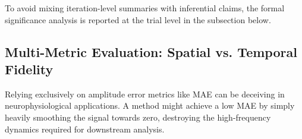 \begin{table}[ht]
\centering
\caption{Mean $\pm$ SD of MAE ($\times 10^{-6}$) and SNR (dB) stratified by degradation severity and spatial failure mode. Best values per stratum in \textbf{bold}.}
\label{tab:main_results}
\end{table}

To avoid mixing iteration-level summaries with inferential claims, the formal significance analysis is reported at the trial level in the subsection below.

\subsection{Multi-Metric Evaluation: Spatial vs. Temporal Fidelity}

Relying exclusively on amplitude error metrics like MAE can be deceiving in neurophysiological applications. A method might achieve a low MAE by simply heavily smoothing the signal towards zero, destroying the high-frequency dynamics required for downstream analysis.


